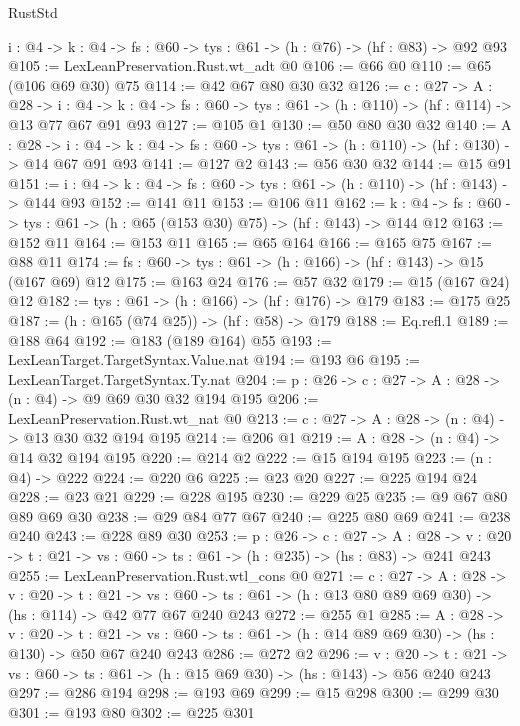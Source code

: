 \begin{lexlean}{RustStd}
\begin{coremodule}
{\begin{coremodule}
{  {i : @4} -> {k : @4} -> {fs : @60} -> {tys : @61} -> (h : @76) -> (hf : @83) -> @92 @93
@105 := LexLeanPreservation.Rust.wt_adt @0
@106 := @66 @0
@110 := @65 (@106 @69 @30) @75
@114 := @42 @67 @80 @30 @32
@126 := {c : @27} ->
  {A : @28} ->
  {i : @4} ->
  {k : @4} -> {fs : @60} -> {tys : @61} -> (h : @110) -> (hf : @114) -> @13 @77 @67 @91 @93
@127 := @105 @1
@130 := @50 @80 @30 @32
@140 := {A : @28} ->
  {i : @4} -> {k : @4} -> {fs : @60} -> {tys : @61} -> (h : @110) -> (hf : @130) -> @14 @67 @91 @93
@141 := @127 @2
@143 := @56 @30 @32
@144 := @15 @91
@151 := {i : @4} -> {k : @4} -> {fs : @60} -> {tys : @61} -> (h : @110) -> (hf : @143) -> @144 @93
@152 := @141 @11
@153 := @106 @11
@162 := {k : @4} -> {fs : @60} -> {tys : @61} -> (h : @65 (@153 @30) @75) -> (hf : @143) -> @144 @12
@163 := @152 @11
@164 := @153 @11
@165 := @65 @164
@166 := @165 @75
@167 := @88 @11
@174 := {fs : @60} -> {tys : @61} -> (h : @166) -> (hf : @143) -> @15 (@167 @69) @12
@175 := @163 @24
@176 := @57 @32
@179 := @15 (@167 @24) @12
@182 := {tys : @61} -> (h : @166) -> (hf : @176) -> @179
@183 := @175 @25
@187 := (h : @165 (@74 @25)) -> (hf : @58) -> @179
@188 := Eq.refl.{1}
@189 := @188 @64
@192 := @183 (@189 @164) @55
@193 := LexLeanTarget.TargetSyntax.Value.nat
@194 := @193 @6
@195 := LexLeanTarget.TargetSyntax.Ty.nat
@204 := {p : @26} -> {c : @27} -> {A : @28} -> (n : @4) -> @9 @69 @30 @32 @194 @195
@206 := LexLeanPreservation.Rust.wt_nat @0
@213 := {c : @27} -> {A : @28} -> (n : @4) -> @13 @30 @32 @194 @195
@214 := @206 @1
@219 := {A : @28} -> (n : @4) -> @14 @32 @194 @195
@220 := @214 @2
@222 := @15 @194 @195
@223 := (n : @4) -> @222
@224 := @220 @6
@225 := @23 @20
@227 := @225 @194 @24
@228 := @23 @21
@229 := @228 @195
@230 := @229 @25
@235 := @9 @67 @80 @89 @69 @30
@238 := @29 @84 @77 @67
@240 := @225 @80 @69
@241 := @238 @240
@243 := @228 @89 @30
@253 := {p : @26} ->
  {c : @27} ->
  {A : @28} ->
  {v : @20} -> {t : @21} -> {vs : @60} -> {ts : @61} -> (h : @235) -> (hs : @83) -> @241 @243
@255 := LexLeanPreservation.Rust.wtl_cons @0
@271 := {c : @27} ->
  {A : @28} ->
  {v : @20} ->
  {t : @21} ->
  {vs : @60} -> {ts : @61} -> (h : @13 @80 @89 @69 @30) -> (hs : @114) -> @42 @77 @67 @240 @243
@272 := @255 @1
@285 := {A : @28} ->
  {v : @20} ->
  {t : @21} -> {vs : @60} -> {ts : @61} -> (h : @14 @89 @69 @30) -> (hs : @130) -> @50 @67 @240 @243
@286 := @272 @2
@296 := {v : @20} ->
  {t : @21} -> {vs : @60} -> {ts : @61} -> (h : @15 @69 @30) -> (hs : @143) -> @56 @240 @243
@297 := @286 @194
@298 := @193 @69
@299 := @15 @298
@300 := @299 @30
@301 := @193 @80
@302 := @225 @301
}
\end{coremodule}}
\end{coremodule}
\end{lexlean}

